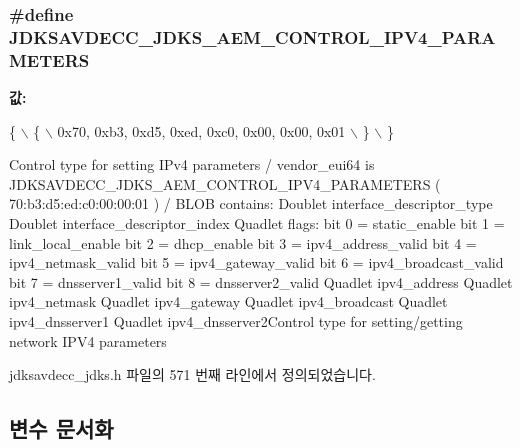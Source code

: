 \subsubsection[{\texorpdfstring{J\+D\+K\+S\+A\+V\+D\+E\+C\+C\+\_\+\+J\+D\+K\+S\+\_\+\+A\+E\+M\+\_\+\+C\+O\+N\+T\+R\+O\+L\+\_\+\+I\+P\+V4\+\_\+\+P\+A\+R\+A\+M\+E\+T\+E\+RS}{JDKSAVDECC_JDKS_AEM_CONTROL_IPV4_PARAMETERS}}]{\setlength{\rightskip}{0pt plus 5cm}\#define J\+D\+K\+S\+A\+V\+D\+E\+C\+C\+\_\+\+J\+D\+K\+S\+\_\+\+A\+E\+M\+\_\+\+C\+O\+N\+T\+R\+O\+L\+\_\+\+I\+P\+V4\+\_\+\+P\+A\+R\+A\+M\+E\+T\+E\+RS}\hypertarget{group__jdks__ipv4_ga0300592382aa9b20451bbf611a680266}{}\label{group__jdks__ipv4_ga0300592382aa9b20451bbf611a680266}
{\bfseries 값\+:}
\begin{DoxyCode}
\{                                                                                                          
                      \(\backslash\)
        \{                                                                                                  
                          \(\backslash\)
            0x70, 0xb3, 0xd5, 0xed, 0xc0, 0x00, 0x00, 0x01                                                 
                          \(\backslash\)
        \}                                                                                                  
                          \(\backslash\)
    \}
\end{DoxyCode}
Control type for setting I\+Pv4 parameters / vendor\+\_\+eui64 is J\+D\+K\+S\+A\+V\+D\+E\+C\+C\+\_\+\+J\+D\+K\+S\+\_\+\+A\+E\+M\+\_\+\+C\+O\+N\+T\+R\+O\+L\+\_\+\+I\+P\+V4\+\_\+\+P\+A\+R\+A\+M\+E\+T\+E\+RS ( 70\+:b3\+:d5\+:ed\+:c0\+:00\+:00\+:01 ) / B\+L\+OB contains\+: Doublet interface\+\_\+descriptor\+\_\+type Doublet interface\+\_\+descriptor\+\_\+index Quadlet flags\+: bit 0 = static\+\_\+enable bit 1 = link\+\_\+local\+\_\+enable bit 2 = dhcp\+\_\+enable bit 3 = ipv4\+\_\+address\+\_\+valid bit 4 = ipv4\+\_\+netmask\+\_\+valid bit 5 = ipv4\+\_\+gateway\+\_\+valid bit 6 = ipv4\+\_\+broadcast\+\_\+valid bit 7 = dnsserver1\+\_\+valid bit 8 = dnsserver2\+\_\+valid Quadlet ipv4\+\_\+address Quadlet ipv4\+\_\+netmask Quadlet ipv4\+\_\+gateway Quadlet ipv4\+\_\+broadcast Quadlet ipv4\+\_\+dnsserver1 Quadlet ipv4\+\_\+dnsserver2\+Control type for setting/getting network I\+P\+V4 parameters 

jdksavdecc\+\_\+jdks.\+h 파일의 571 번째 라인에서 정의되었습니다.



\subsection{변수 문서화}
